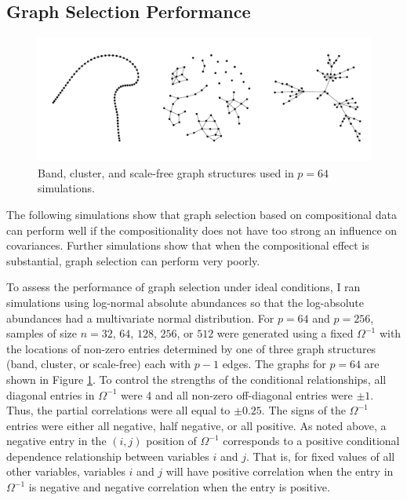 \documentclass[10pt]{article}
\begin{document}
\subsection*{Graph Selection Performance}

\begin{figure}
\caption{Band, cluster, and scale-free graph structures used in $p = 64$ simulations.}
\label{f:graphs}
\begin{center}
\includegraphics[width=6.5in]{figs/graphs-64.pdf}
\end{center}
\end{figure}

The following simulations show that graph selection based on compositional data can perform well if the compositionality does not have too strong an influence on covariances. Further simulations show that when the compositional effect is substantial, graph selection can perform very poorly.

To assess the performance of graph selection under ideal conditions, I ran simulations using log-normal absolute abundances so that the log-absolute abundances had a multivariate normal distribution. For $p = 64$ and $p = 256$, samples of size $n = 32$, $64$, $128$, $256$, or $512$ were generated using a fixed $\Omega^{-1}$ with the locations of non-zero entries determined by one of three graph structures (band, cluster, or scale-free) each with $p-1$ edges. The graphs for $p = 64$ are shown in Figure \ref{f:graphs}. To control the strengths of the conditional relationships, all diagonal entries in $\Omega^{-1}$ were 4 and all non-zero off-diagonal entries were $\pm 1$. Thus, the partial correlations were all equal to $\pm 0.25$. The signs of the $\Omega^{-1}$ entries were either all negative, half negative, or all positive. As noted above, a negative entry in the $(i,j)$ position of $\Omega^{-1}$ corresponds to a positive conditional dependence relationship between variables $i$ and $j$. That is, for fixed values of all other variables, variables $i$ and $j$ will have positive correlation when the entry in $\Omega^{-1}$ is negative and negative correlation when the entry is positive.
\end{document}
